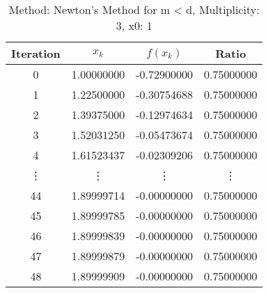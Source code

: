 \begin{table}
\centering
\caption{Method: Newton's Method for m < d, Multiplicity: 3, x0: 1}
\label{tab:table_Newton's_Method_for_m_<_d_3_1}
\begin{tabular}{c c c c}
\toprule
Iteration &      $x_k$ &    $f(x_k)$ &      Ratio \\
\midrule
        0 & 1.00000000 & -0.72900000 & 0.75000000 \\
        1 & 1.22500000 & -0.30754688 & 0.75000000 \\
        2 & 1.39375000 & -0.12974634 & 0.75000000 \\
        3 & 1.52031250 & -0.05473674 & 0.75000000 \\
        4 & 1.61523437 & -0.02309206 & 0.75000000 \\
   \vdots &     \vdots &      \vdots &     \vdots \\
       44 & 1.89999714 & -0.00000000 & 0.75000000 \\
       45 & 1.89999785 & -0.00000000 & 0.75000000 \\
       46 & 1.89999839 & -0.00000000 & 0.75000000 \\
       47 & 1.89999879 & -0.00000000 & 0.75000000 \\
       48 & 1.89999909 & -0.00000000 & 0.75000000 \\
\bottomrule
\end{tabular}
\end{table}
